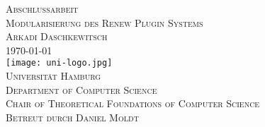 \begin{titlepage}
\begin{center}
	\vspace{6em}
	{\Large \textsc{Abschlussarbeit}}\\
	\vspace{5em}
	{\huge \textsc{Modularisierung des Renew Plugin Systems}}\\
	\vspace{4em}
	{\Large \textsc{Arkadi Daschkewitsch}}\\
	\vspace{3em}
	{\Large \textsc{\today}}\\
	\vspace{3em}
	\texttt{[image: uni-logo.jpg]}\\
	\vspace{3em}
	{\Large \textsc{Universität Hamburg}}\\
	\vspace{1em}
	{\Large \textsc{Department of Computer Science}}\\
	\vspace{1em}
	{\Large \textsc{Chair of Theoretical Foundations of Computer Science}}\\
	\vspace{2em}
	{\Large \textsc{Betreut durch Daniel Moldt}}\\
	
\end{center}
\end{titlepage}